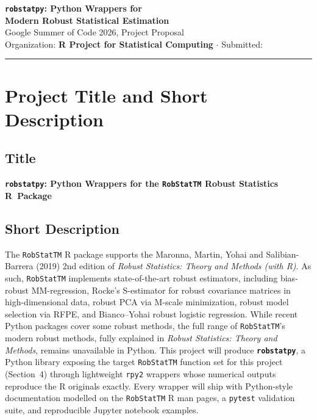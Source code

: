 \documentclass[11pt, a4paper]{article}
\begin{document}
\thispagestyle{empty}
\begin{center}
  {\LARGE\bfseries\color{uwpurple}
    \texttt{robstatpy}: Python Wrappers for\\[5pt]
    Modern Robust Statistical Estimation
  }\\[10pt]
  {\large\color{black}
    Google Summer of Code 2026, Project Proposal
  }\\[5pt]
  {\normalsize\color{black}
    Organization: \textbf{R Project for Statistical Computing}
    \quad $\cdot$ \quad
    Submitted: 
  }
\end{center}

\vspace{0.5em}
\noindent\textcolor{uwpurple}{\rule{\linewidth}{2pt}}
\vspace{0.3em}

\section{Project Title and Short Description}

\subsection*{Title}

\textbf{\texttt{robstatpy}: Python Wrappers for the \texttt{RobStatTM}
Robust Statistics R~Package}

\subsection*{Short Description}

The \texttt{RobStatTM} R package supports the Maronna, Martin, Yohai and
Salibian-Barrera (2019) 2nd edition of \emph{Robust Statistics: Theory and
Methods (with R)}. As such, \texttt{RobStatTM} implements state-of-the-art
robust estimators, including bias-robust MM-regression, Rocke's S-estimator
for robust covariance matrices in high-dimensional data, robust PCA via M-scale minimization, robust model
selection via RFPE, and Bianco--Yohai robust logistic regression.
While recent Python packages cover some robust methods, the full range of
\texttt{RobStatTM}'s modern robust methods, fully explained in
\emph{Robust Statistics: Theory and Methods}, remains unavailable in Python.
This project will produce \textbf{\texttt{robstatpy}}, a Python library
exposing the target \texttt{RobStatTM} function set for this project
(Section~4) through lightweight
\texttt{rpy2} wrappers whose numerical outputs reproduce the R originals exactly.
Every wrapper will ship with Python-style documentation modelled on the
\texttt{RobStatTM} R man pages, a \texttt{pytest} validation suite, and
reproducible Jupyter notebook examples.
\end{document}
